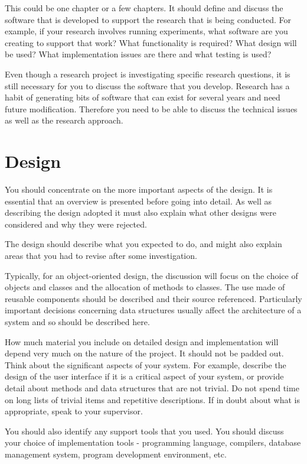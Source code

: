 This could be one chapter or a few chapters. It should define and discuss the software that is developed to support the research that is being conducted. For example, if your research involves running experiments, what software are you creating to support that work? What functionality is required? What design will be used? What implementation issues are there and what testing is used? 

Even though a research project is investigating specific research questions, it is still necessary for you to discuss the software that you develop. Research has a habit of generating bits of software that can exist for several years and need future modification. Therefore you need to be able to discuss the technical issues as well as the research approach. 

\section{Design}
You should concentrate on the more important aspects of the design. It is essential that an overview is presented before going into detail. As well as describing the design adopted it must also explain what other designs were considered and why they were rejected.

The design should describe what you expected to do, and might also explain areas that you had to revise after some investigation.

Typically, for an object-oriented design, the discussion will focus on the choice of objects and classes and the allocation of methods to classes. The use made of reusable components should be described and their source referenced. Particularly important decisions concerning data structures usually affect the architecture of a system and so should be described here.

How much material you include on detailed design and implementation will depend very much on the nature of the project. It should not be padded out. Think about the significant aspects of your system. For example, describe the design of the user interface if it is a critical aspect of your system, or provide detail about methods and data structures that are not trivial. Do not spend time on long lists of trivial items and repetitive descriptions. If in doubt about what is appropriate, speak to your supervisor.
 
You should also identify any support tools that you used. You should discuss your choice of implementation tools - programming language, compilers, database management system, program development environment, etc.

